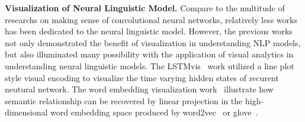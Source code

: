 \noindent\textbf{Visualization of Neural Linguistic Model.}
Compare to the multitude of researchs on making sense of convolutional neural networks, relatively less works has been dedicated to the neural linguistic model.
%
However, the previous works~\cite{KarpathyJohnson2015, LiChenHovy2015, StrobeltGehrmannPfister2018, LiuBremerJayaraman2018} not only demonstrated the benefit of visualization in understanding NLP models, but also illuminated many possibility with the application of visual analytics in understanding neural linguistic models.
The LSTMvis~\cite{StrobeltGehrmannPfister2018} work utilized a line plot style visual encoding to visualize the time varying hidden states of recurent neutural network. The word embedding visualization work~\cite{LiuBremerJayaraman2018} illustrate how semantic relationship can be recovered by linear projection in the high-dimensional word embedding space produced by word2vec~\cite{MikolovSutskeverChen2013} or glove~\cite{PenningtonSocherManning2014}.
